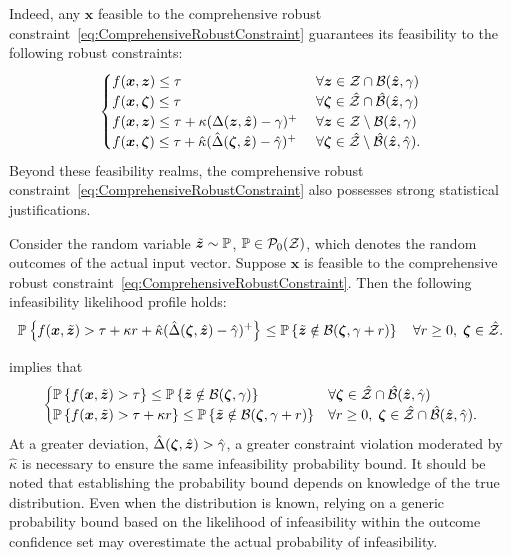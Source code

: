 \documentclass[mnsc, nonblindrev]{informswp}
\newcommand{\1}[1]{\mathds{1}{\left(#1\right)}}
\begin{document}
Indeed, any $\bm x$ feasible to the comprehensive robust constraint~\eqref{eq:ComprehensiveRobustConstraint} guarantees its feasibility to the following robust constraints:
$$
\begin{cases}
f(\bm x, \bm z) \leq \tau &~\forall \bm z \in \mathcal{Z} \cap \mathcal{B}(\hat{\bm{z}}, \gamma) \\
f(\bm x, \bm \zeta) \leq \tau &~\forall \bm \zeta \in \hat {\mathcal{Z}} \cap \hat {\mathcal{B}}(\hat{\bm{z}}, \gamma) \\
f(\bm x,\bm z) \leq \tau +  \kappa (\Delta(\bm z,\hat{\bm{z}}) - \gamma)^+ &~\forall \bm z \in \mathcal{Z} \setminus  \mathcal{B}(\hat{\bm{z}}, \gamma) \\
f(\bm x,\bm \zeta) \leq \tau +  \hat \kappa (\hat \Delta(\bm \zeta,\hat{\bm{z}}) - \hat \gamma)^+ &~\forall  \bm\zeta \in \hat {\mathcal{Z}} \setminus \hat {\mathcal{B}}(\hat{\bm{z}}, \hat \gamma). 
\end{cases}
$$
Beyond these feasibility realms, the comprehensive robust constraint~\eqref{eq:ComprehensiveRobustConstraint} also possesses strong statistical justifications.

\begin{theorem}
\label{thm:StatisticalJustification}
Consider the random variable $\tilde{\bm{z}}\sim \mathbb{P}$, $\mathbb{P} \in \mathcal{P}_0(\mathcal{Z})$, which denotes the random outcomes of the actual input vector. Suppose $\bm x$ is feasible to the comprehensive robust constraint~\eqref{eq:ComprehensiveRobustConstraint}. Then the following infeasibility likelihood profile holds:
$$
\mathbb{P}\left\{f(\bm x,\tilde{\bm{z}}) > \tau + \kappa r  + \hat \kappa (\hat \Delta(\bm \zeta,\hat{\bm{z}}) - \hat \gamma)^+ \right\} \leq  \mathbb{P}\left\{\tilde{\bm{z}} \notin \mathcal{B}(\bm \zeta,\gamma+r)\right\} ~~~\forall r \geq 0, \; \bm \zeta \in \hat {\mathcal{Z}}.
$$
\end{theorem}

 implies that 
$$
\begin{cases}
\mathbb{P}\left\{f(\bm x,\tilde{\bm{z}}) > \tau \right\} \leq   \mathbb{P}\left\{\tilde{\bm{z}} \notin \mathcal{B}(\bm \zeta,\gamma)\right\} & \forall \bm \zeta \in\hat {\mathcal{Z}} \cap \hat {\mathcal{B}}(\hat{\bm{z}}, \hat \gamma) \\
\mathbb{P}\left\{f(\bm x,\tilde{\bm{z}}) > \tau + \kappa r \right\} \leq  \mathbb{P}\left\{\tilde{\bm{z}} \notin \mathcal{B}(\bm \zeta,\gamma+r)\right\} & \forall r \geq 0, \; \bm \zeta \in\hat {\mathcal{Z}} \cap \hat {\mathcal{B}}(\hat{\bm{z}}, \hat \gamma).
\end{cases}
$$
At a greater deviation, $\hat \Delta(\bm \zeta,\hat{\bm{z}})>\hat \gamma$, a greater constraint violation moderated by $\hat \kappa$ is necessary to ensure the same infeasibility probability bound. It should be noted that establishing the probability bound depends on knowledge of the true distribution. Even when the distribution is known, relying on a generic probability bound based on the likelihood of infeasibility within the outcome confidence set may overestimate the actual probability of infeasibility. 
\end{document}
